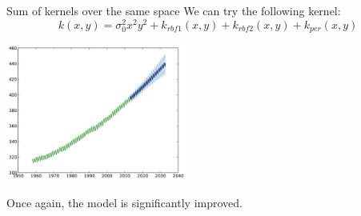 \documentclass{beamer}
\begin{document}
\begin{frame}{Sum of kernels over the same space }
We can try the following kernel:
\begin{equation*}
k(x,y) = \sigma_0^2  x^2 y^2 + k_{rbf1}(x,y) + k_{rbf2}(x,y) + k_{per}(x,y)
\end{equation*}
\pause
\begin{center}
\vspace{-8mm}  \includegraphics[height=4.5cm]{figures/python/CO2-rbfabpq}
\end{center}
\begin{block}{}
\centering
\alert{Once again, the model is significantly improved.}
\end{block}
\end{frame}
\end{document}
